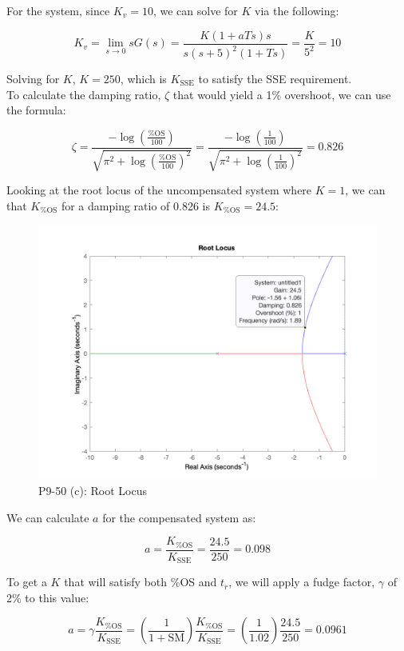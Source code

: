 \documentclass[12pt, letterpaper]{../assignment}
\begin{document}
For the system, since $ K_v = 10 $, we can solve for $K$ via the following:

$$ K_v = \lim_{s \to 0} s G(s)
       = \frac{K(1 + a T s)s}{s (s+5)^2 (1 + T s)}
       = \frac{K}{5^2} = 10 $$

Solving for $K$, $K = 250$, which is $K_\text{SSE}$ to satisfy the SSE requirement.
\\
To calculate the damping ratio, $\zeta$ that would yield a 1\% overshoot, we can use the formula:

$$ \zeta = \frac{-\log \left(\frac{\text{\%OS}}{100}\right)}{\sqrt{\pi^2 + \log \left(\frac{\text{\%OS}}{100}\right)^2}}
         = \frac{-\log \left(\frac{1}{100}\right)}{\sqrt{\pi^2 + \log \left(\frac{1}{100}\right)^2}}
         = 0.826 $$ 

Looking at the root locus of the uncompensated system where $K = 1$,
we can that $K_\text{\%OS}$ for a damping ratio of 0.826 is $K_\text{\%OS} = 24.5$:

\begin{figure}[H]
    \centering
    \includegraphics[width=1\linewidth]{./figures/rlocus_9_50c.png}
    \caption{P9-50 (c): Root Locus}
\end{figure}

We can calculate $a$ for the compensated system as:

$$ a = \frac{K_\text{\%OS}}{K_\text{SSE}} = \frac{24.5}{250} = 0.098 $$

To get a $K$ that will satisfy both \%OS and $t_r$, we will apply a fudge factor,
$\gamma$ of 2\% to this value:

$$ a = \gamma \frac{K_\text{\%OS}}{K_\text{SSE}}
= \left(\frac{1}{1+\text{SM}}\right) \frac{K_\text{\%OS}}{K_\text{SSE}}
= \left(\frac{1}{1.02}\right) \frac{24.5}{250} = 0.0961 $$
\end{document}
